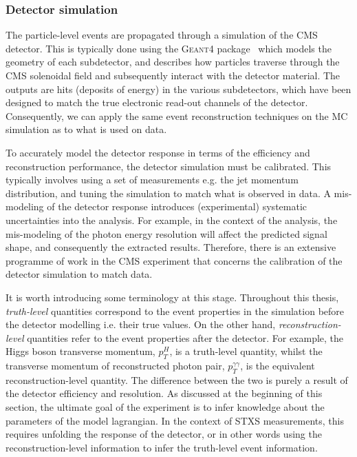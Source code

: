 \subsubsection{Detector simulation}
The particle-level events are propagated through a simulation of the CMS detector. This is typically done using the \textsc{Geant4} package~\cite{Agostinelli:2002hh} which models the geometry of each subdetector, and describes how particles traverse through the CMS solenoidal field and subsequently interact with the detector material. The outputs are hits (deposits of energy) in the various subdetectors, which have been designed to match the true electronic read-out channels of the detector. Consequently, we can apply the same event reconstruction techniques on the MC simulation as to what is used on data. 

To accurately model the detector response in terms of the efficiency and reconstruction performance, the detector simulation must be calibrated. This typically involves using a set of measurements e.g. the jet momentum distribution, and tuning the simulation to match what is observed in data. A mis-modeling of the detector response introduces (experimental) systematic uncertainties into the analysis. For example, in the context of the \Hgg analysis, the mis-modeling of the photon energy resolution will affect the predicted signal shape, and consequently the extracted results. Therefore, there is an extensive programme of work in the CMS experiment that concerns the calibration of the detector simulation to match data.

It is worth introducing some terminology at this stage. Throughout this thesis, \textit{truth-level} quantities correspond to the event properties in the simulation before the detector modelling i.e. their true values. On the other hand, \textit{reconstruction-level} quantities refer to the event properties after the detector. For example, the Higgs boson transverse momentum, $p_T^H$, is a truth-level quantity, whilst the transverse momentum of reconstructed photon pair, $p_T^{\gamma\gamma}$, is the equivalent reconstruction-level quantity. The difference between the two is purely a result of the detector efficiency and resolution. As discussed at the beginning of this section, the ultimate goal of the experiment is to infer knowledge about the parameters of the model lagrangian. In the context of STXS measurements, this requires unfolding the response of the detector, or in other words using the reconstruction-level information to infer the truth-level event information.

